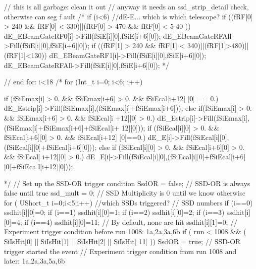 \begin{DoxyCode}
{{{{{{{                // this is all garbage: clean it out
                // anyway it needs an ssd_strip_detail check, otherwise can seg f
      ault
                /*
                if (i<6) {//dE-E... which is which telescope?
                  if ((fRF[0] > 240 && fRF[0] < 330)||(fRF[0] > 470 && fRF[0] < 5
      40 )){
                         dE_EBeamGateRF0[i]->Fill(fSiE[i][0],fSiE[i+6][0]);
                         dE_EBeamGateRFAll->Fill(fSiE[i][0],fSiE[i+6][0]);
                      }
                  if ((fRF[1] > 240 && fRF[1] < 340)||(fRF[1]>480)||(fRF[1]<130))
      {
                         dE_EBeamGateRF1[i]->Fill(fSiE[i][0],fSiE[i+6][0]);
                         dE_EBeamGateRFAll->Fill(fSiE[i][0],fSiE[i+6][0]);
                      }
                }*/
                 
          } // end for: i<18
/*
            for (Int_t i=0; i<6; i++){
                        if (fSiEmax[i] > 0. && fSiEmax[i+6] > 0. && fSiEcal[i+12]
      [0] == 0.){
                dE_Estrip[i]->Fill(fSiEmax[i],(fSiEmax[i]+fSiEmax[i+6]));}
                        else if(fSiEmax[i] > 0. && fSiEmax[i+6] > 0. && fSiEcal[i
      +12][0] > 0.){
                dE_Estrip[i]->Fill(fSiEmax[i],(fSiEmax[i]+fSiEmax[i+6]+fSiEcal[i+
      12][0]));       }
                  if (fSiEcal[i][0] > 0. && fSiEcal[i+6][0] > 0. && fSiEcal[i+12]
      [0]==0.){
                dE_E[i]->Fill(fSiEcal[i][0],(fSiEcal[i][0]+fSiEcal[i+6][0]));}
                  else if (fSiEcal[i][0] > 0. && fSiEcal[i+6][0] > 0. && fSiEcal[
      i+12][0] > 0.){
                dE_E[i]->Fill(fSiEcal[i][0],(fSiEcal[i][0]+fSiEcal[i+6][0]+fSiEca
      l[i+12][0]));}
            
                }
  */    
          // Set up the SSD-OR trigger condition
          SsdOR = false; // SSD-OR is always false until true
          ssd_mult = 0; // SSD Multiplicity is 0 until we know otherwise
          for ( UShort_t i=0;i<5;i++){ //which SSDs triggered?
            // SSD numbers
            if (i==0) ssdhit[i][0]=0;
            if (i==1) ssdhit[i][0]=1;
            if (i==2) ssdhit[i][0]=2;
            if (i==3) ssdhit[i][0]=4;
            if (i==4) ssdhit[i][0]=11;
            // By default, none are hit
            ssdhit[i][1]=0; 
          }
          // Experiment trigger condition before run 1008: 1a,2a,3a,6b
          if ( run < 1008 && ( SiIsHit[0] || SiIsHit[1] || SiIsHit[2] || SiIsHit[
      11] )) SsdOR = true; // SSD-OR trigger started the event
          // Experiment trigger condition from run 1008 and later: 1a,2a,3a,5a,6b
      
}}}}}}
\end{DoxyCode}

